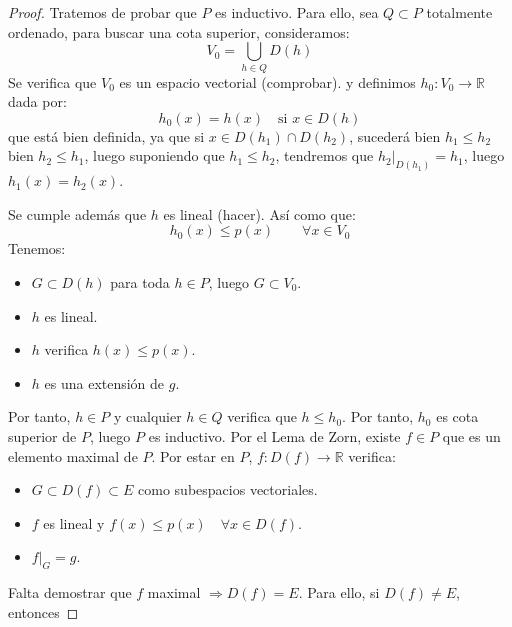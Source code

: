 \begin{teo}
\begin{proof}
        \noindent
        Tratemos de probar que $P$ es inductivo. Para ello, sea $Q\subset P$ totalmente ordenado, para buscar una cota superior, consideramos:
        \begin{equation*}
            V_0 = \bigcup_{h\in Q}D(h)
        \end{equation*}
        Se verifica que $V_0$ es un espacio vectorial (comprobar). %
        y definimos $h_0:V_0 \to \mathbb{R}$ dada por:
        \begin{equation*}
            h_0(x) = h(x) \quad \text{si\ } x\in D(h)
        \end{equation*}
        que está bien definida, ya que si $x\in D(h_1)\cap D(h_2)$, sucederá bien $h_1 \leq h_2$ bien $h_2 \leq h_1$, luego suponiendo que $h_1\leq h_2$, tendremos que $h_2\big|_{D(h_1)} = h_1$, luego $h_1(x) = h_2(x)$.

        Se cumple además que $h$ es lineal (hacer). %
        Así como que: %
        \begin{equation*}
            h_0(x) \leq p(x) \qquad \forall x\in V_0
        \end{equation*}
        Tenemos:
        \begin{itemize}
            \item $G\subset D(h)$ para toda $h\in P$, luego $G\subset V_0$.
            \item $h$ es lineal.
            \item $h$ verifica $h(x) \leq p(x)$.
            \item $h$ es una extensión de $g$.
        \end{itemize}
        Por tanto, $h\in P$ y cualquier $h\in Q$ verifica que $h\leq h_0$. Por tanto, $h_0$ es cota superior de $P$, luego $P$ es inductivo. Por el Lema de Zorn, existe $f\in P$ que es un elemento maximal de $P$. Por estar en $P$,  $f:D(f)\to \mathbb{R}$ verifica:
        \begin{itemize}
            \item $G\subset D(f)\subset E$ como subespacios vectoriales.
            \item $f$ es lineal y $f(x) \leq p(x) \quad  \forall x\in D(f)$.
            \item $f\big|_G = g$.
        \end{itemize}
        Falta demostrar que $f$ maximal $\Longrightarrow D(f) = E$. Para ello, si $D(f)\neq E$, entonces %
    \end{proof}
\end{teo}

